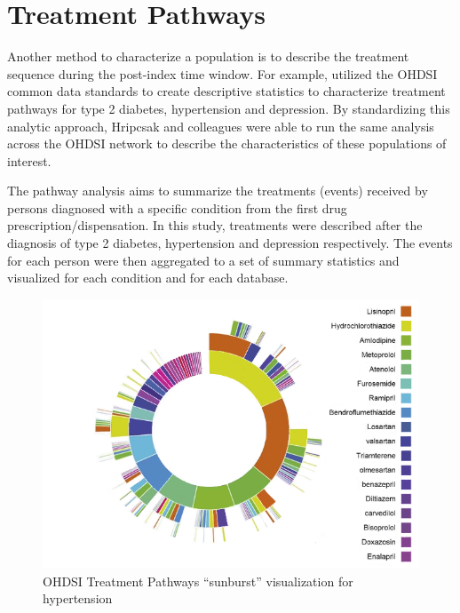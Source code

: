 \documentclass[11pt]{book}
\theoremstyle{definition}
\theoremstyle{definition}
\theoremstyle{definition}
\theoremstyle{remark}
\begin{document}
\hypertarget{treatment-pathways}{%
\section{Treatment Pathways}\label{treatment-pathways}}

Another method to characterize a population is to describe the treatment sequence during the post-index time window. For example, \citet{Hripcsak7329} utilized the OHDSI common data standards to create descriptive statistics to characterize treatment pathways for type 2 diabetes, hypertension and depression. By standardizing this analytic approach, Hripcsak and colleagues were able to run the same analysis across the OHDSI network to describe the characteristics of these populations of interest.

The pathway analysis aims to summarize the treatments (events) received by persons diagnosed with a specific condition from the first drug prescription/dispensation. In this study, treatments were described after the diagnosis of type 2 diabetes, hypertension and depression respectively. The events for each person were then aggregated to a set of summary statistics and visualized for each condition and for each database.

\begin{figure}

{\centering \includegraphics[width=0.9\linewidth]{images/Characterization/pnasTreatmentPathwaysSunburst} 

}

\caption{OHDSI Treatment Pathways “sunburst” visualization for hypertension}\label{fig:treatmentPathwaysSunburstDataViz}
\end{figure}
\end{document}
